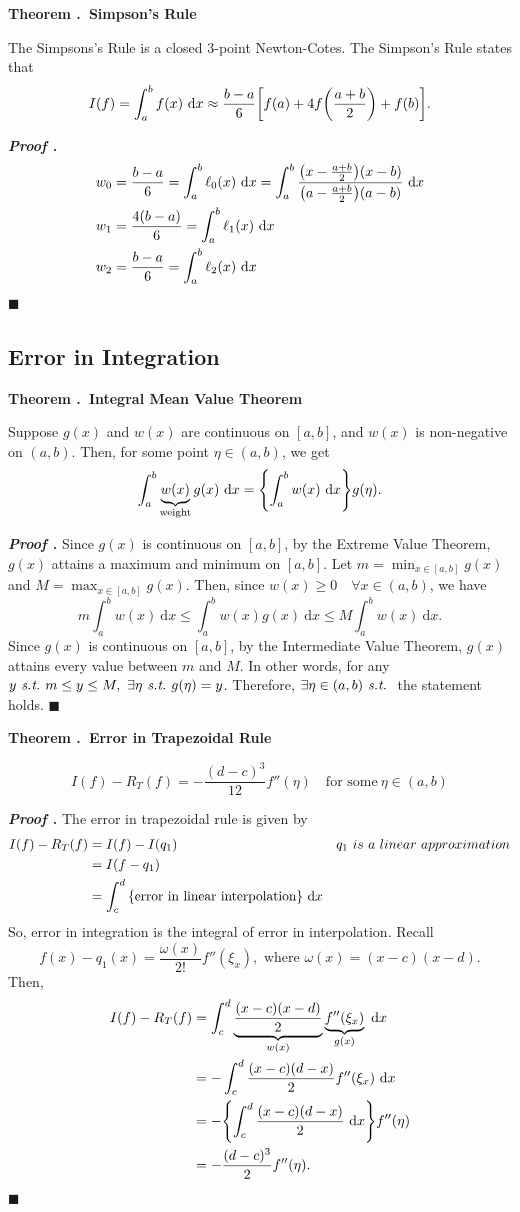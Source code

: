 \documentclass[12pt, a4paper]{article}
\newcounter{index}[subsection]
\newenvironment*{thm}[1]{\begin{tcolorbox}\par\noindent\textbf{Theorem \thesubsection.\stepcounter{index}\theindex\ #1} \par}{\par\end{tcolorbox}}
\newcounter{nprf}[subsection]
\newenvironment*{prf}{\par\indent\textbf{\textit{Proof \stepcounter{nprf}\thenprf.}}}{\hfill$\blacksquare$\par}
\def\d{{\mathrm{d}}}
\def\dsst{\displaystyle}
\def\st{\emph{\ s.t.\ }}
\def\l{\ell}
\begin{document}
\begin{thm}{Simpson's Rule}
	The Simpsons's Rule is a closed $3$-point Newton-Cotes. The Simpson's Rule states that \[I(f)=\int_a^bf(x)\ \d{x}\approx\dfrac{b-a}{6}\qty[f(a)+4f\qty(\dfrac{a+b}{2})+f(b)].\]	
\end{thm}
\begin{prf}
	\begin{align*}w_0&=\dfrac{b-a}{6}=\int_a^b\l_0(x)\ \d{x}=\int_a^b\dfrac{\qty(x-\frac{a+b}{2})(x-b)}{\qty(a-\frac{a+b}{2})(a-b)}\ \d{x}\\w_1&=\dfrac{4(b-a)}{6}=\int_a^b\l_1(x)\ \d{x}\\w_2&=\dfrac{b-a}{6}=\int_a^b\l_2(x)\ \d{x}\end{align*}
\end{prf}

\subsection{Error in Integration}
\begin{thm}{Integral Mean Value Theorem}
	Suppose $g(x)$ and $w(x)$ are continuous on $[a,b]$, and $w(x)$ is non-negative on $(a,b)$. Then, for some point $\eta\in(a,b)$, we get \[\int_a^b\underbrace{w(x)}_\text{weight}g(x)\ \d{x}=\qty{\int_a^bw(x)\ \d{x}}g(\eta).\]	
\end{thm}
\begin{prf}
	Since $g(x)$ is continuous on $[a,b]$, by the Extreme Value Theorem, $g(x)$ attains a maximum and minimum on $[a,b]$. Let $\dsst m=\min_{x\in[a,b]}g(x)$ and $M=\dsst\max_{x\in[a,b]}g(x)$. Then, since $w(x)\geq0\quad\forall x\in(a,b)$, we have \[m\int_a^bw(x)\ \d{x}\leq\int_a^b w(x)g(x)\ \d{x}\leq M\int_a^bw(x)\ \d{x}.\] Since $g(x)$ is continuous on $[a,b]$, by the Intermediate Value Theorem, $g(x)$ attains every value between $m$ and $M$. In other words, for any $y\st m\leq y\leq M,\ \exists\eta\st g(\eta)=y$. Therefore, $\exists\eta\in(a,b)\st$ the statement holds. 
\end{prf}
\begin{thm}{Error in Trapezoidal Rule}
	\[I(f)-R_T(f)=-\dfrac{(d-c)^3}{12}f''(\eta)\quad\text{for some}\ \eta\in(a,b)\]	
\end{thm}
\begin{prf}
	The error in trapezoidal rule is given by \begin{align*}I(f)-R_T(f)&=I(f)-I(q_1)&q_1\ is\ a\ linear\ approximation\\&=I(f-q_1)\\&=\int_c^d\qty{\text{error in linear interpolation}}\ \d{x}\end{align*} So, error in integration is the integral of error in interpolation. Recall \[f(x)-q_1(x)=\dfrac{\omega(x)}{2!}f''(\xi_x),\text{ where }\omega(x)=(x-c)(x-d).\] Then, \begin{align*}I(f)-R_T(f)&=\int_c^d\underbrace{\dfrac{(x-c)(x-d)}{2}}_{w(x)}\underbrace{f''(\xi_x)}_{g(x)}\ \d{x}\\&=-\int_c^d\dfrac{(x-c)(d-x)}{2}f''(\xi_x)\ \d{x}\\&=-\qty{\int_c^d\dfrac{(x-c)(d-x)}{2}\ \d{x}}f''(\eta)\\&=-\dfrac{(d-c)^3}{2}f''(\eta).\end{align*}
\end{prf}
\end{document}
